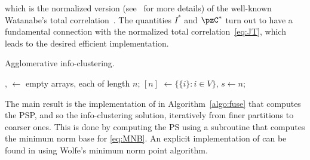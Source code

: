 which is the normalized version (see~\cite{chan15mi} for more details) of
the well-known Watanabe's total correlation~\cite{watanabe60}.
The quantities $I^{*}$ and $\pzC^{*}$ turn out to have a fundamental connection
with the normalized total correlation~\eqref{eq:JT}, which leads to the desired efficient
implementation.


%

\begin{algorithm}
	\caption{Agglomerative info-clustering.}
	\label{alg:aic}
	\BlankLine
	, $\leftarrow$ empty arrays, each of length $n$;\;
	$[n]$ $\leftarrow \{\{i\}:i\in V\}$, $s\leftarrow n$;\;
\end{algorithm}

The main result is the implementation of \Agglomerate in Algorithm~\ref{algo:fuse} that computes the
PSP, and so the info-clustering solution, iteratively from finer partitions to coarser
ones. This is done by computing the PS using a subroutine \MinNormBase that computes the minimum
norm base for \eqref{eq:MNB}. An explicit implementation of \MinNormBase can be found in
\cite{fujishige11} using Wolfe's minimum norm point algorithm.

